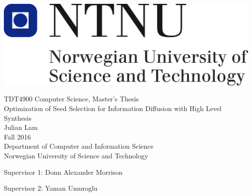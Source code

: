 \thispagestyle{empty}
\includegraphics[scale=0.3]{Figures/ntnu}
\mbox{}\\[6pc]
\begin{center}
\Large{TDT4900  Computer Science, Master's Thesis}\\[1pc]
\Huge{Optimization of Seed Selection for Information Diffusion with High Level Synthesis}\\[2pc]

\Large{Julian Lam}\\[1pc]
\large{Fall 2016}\\[2pc]


Department of Computer and Information Science\\
Norwegian University of Science and Technology
\end{center}
\vfill

\noindent Supervisor 1: Donn Alexander Morrison

\noindent Supervisor 2: Yaman Umuroglu